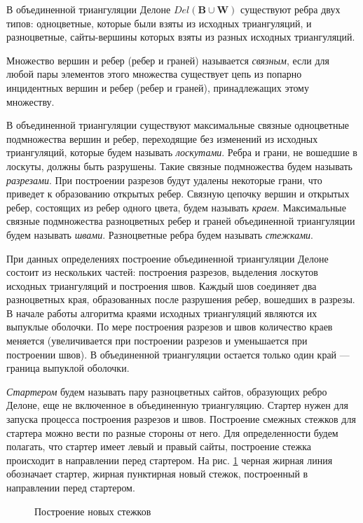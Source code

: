 \documentclass[12pt]{article}
\begin{document}
В объединенной триангуляции Делоне $Del(\textbf{B} \cup \textbf{W})$ существуют ребра двух типов:
одноцветные, которые были взяты из исходных триангуляций, и разноцветные, сайты-вершины которых взяты из разных исходных триангуляций.

Множество вершин и ребер (ребер и граней) называется {\itshape связным}, если для любой пары элементов этого множества
существует цепь из попарно инцидентных вершин и ребер (ребер и граней), принадлежащих этому множеству.

В объединенной триангуляции существуют максимальные связные одноцветные подмножества вершин и ребер,
переходящие без изменений из исходных триангуляций, которые будем называть {\itshape лоскутами}.
Ребра и грани, не вошедшие в лоскуты, должны быть разрушены.
Такие связные подмножества будем называть {\itshape разрезами}.
При построении разрезов будут удалены некоторые грани, что приведет к образованию открытых ребер.
Связную цепочку вершин и открытых ребер, состоящих из ребер одного цвета, будем называть {\itshape краем}.
Максимальные связные подмножества разноцветных ребер и граней объединенной триангуляции будем называть {\itshape швами}.
Разноцветные ребра будем называть {\itshape стежками}.

При данных определениях построение объединенной триангуляции Делоне состоит из нескольких частей: построения разрезов,
выделения лоскутов исходных триангуляций и построения швов.
Каждый шов соединяет два разноцветных края, образованных после разрушения ребер, вошедших в разрезы.
В начале работы алгоритма краями исходных триангуляций являются их выпуклые оболочки.
По мере построения разрезов и швов количество краев меняется
(увеличивается при построении разрезов и уменьшается при построении швов).
В объединенной триангуляции остается только один край --- граница выпуклой оболочки.

{\itshape Стартером} будем называть пару разноцветных сайтов, образующих ребро Делоне,
еще не включенное в объединенную триангуляцию.
Стартер нужен для запуска процесса построения разрезов и швов.
Построение смежных стежков для стартера можно вести по разные стороны от него.
Для определенности будем полагать, что стартер имеет левый и правый сайты,
построение стежка происходит в направлении перед стартером.
На рис. \ref{pic:dir} черная жирная линия обозначает стартер, жирная пунктирная новый стежок, построенный в направлении перед стартером.

\begin{figure}[htb!]
	\begin{minipage}[h]{0.49\linewidth}
	\end{minipage}
	\hfill
	\begin{minipage}[h]{0.49\linewidth}
	\end{minipage}
	\caption{Построение новых стежков}
	\label{pic:dir}
\end{figure}
\end{document}
